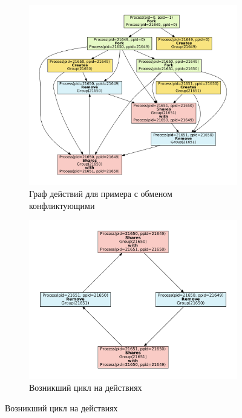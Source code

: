 \begin{figure}[ht!]
	\begin{subfigure}[b]{0.5\textwidth}
		\centering
		\includegraphics[width=\textwidth]{fig/badexgraph.pdf}
	\caption{Граф действий для примера с обменом конфликтующими}
	\label{chap2:fig:impgraph}
	\end{subfigure}
	\begin{subfigure}[b]{0.46\textwidth}
		\centering
		\includegraphics[width=\textwidth]{fig/badexcycle.pdf}
	\caption{Возникший цикл на действиях}
	\label{chap2:fig:impcycle}
	\end{subfigure}
\end{figure}

